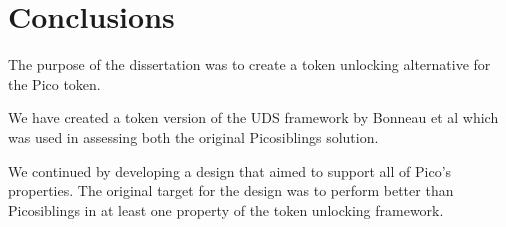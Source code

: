 \section{Conclusions}
The purpose of the dissertation was to create a token unlocking alternative for the Pico token. 

We have created a token version of the UDS framework by Bonneau et al \cite{} which was used in assessing both the original Picosiblings solution. 

We continued by developing a design that aimed to support all of Pico's properties. The original target for the design was to perform better than Picosiblings in at least one property of the token unlocking framework. 


